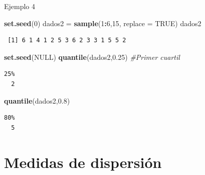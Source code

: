 \documentclass[
  ignorenonframetext,
]{beamer}
\newenvironment{Shaded}{\begin{snugshade}}{\end{snugshade}}
\newcommand{\CommentTok}[1]{\textcolor[rgb]{0.56,0.35,0.01}{\textit{#1}}}
\newcommand{\DataTypeTok}[1]{\textcolor[rgb]{0.13,0.29,0.53}{#1}}
\newcommand{\DecValTok}[1]{\textcolor[rgb]{0.00,0.00,0.81}{#1}}
\newcommand{\FloatTok}[1]{\textcolor[rgb]{0.00,0.00,0.81}{#1}}
\newcommand{\KeywordTok}[1]{\textcolor[rgb]{0.13,0.29,0.53}{\textbf{#1}}}
\newcommand{\NormalTok}[1]{#1}
\newcommand{\OperatorTok}[1]{\textcolor[rgb]{0.81,0.36,0.00}{\textbf{#1}}}
\newcommand{\OtherTok}[1]{\textcolor[rgb]{0.56,0.35,0.01}{#1}}
\newcommand{\StringTok}[1]{\textcolor[rgb]{0.31,0.60,0.02}{#1}}
\begin{document}
\begin{frame}[fragile]{Ejemplo 4}
\protect\hypertarget{ejemplo-4}{}

\begin{Shaded}
\begin{Highlighting}[]
\KeywordTok{set.seed}\NormalTok{(}\DecValTok{0}\NormalTok{)}
\NormalTok{dados2 =}\StringTok{ }\KeywordTok{sample}\NormalTok{(}\DecValTok{1}\OperatorTok{:}\DecValTok{6}\NormalTok{,}\DecValTok{15}\NormalTok{, }\DataTypeTok{replace =} \OtherTok{TRUE}\NormalTok{)}
\NormalTok{dados2}
\end{Highlighting}
\end{Shaded}

\begin{verbatim}
 [1] 6 1 4 1 2 5 3 6 2 3 3 1 5 5 2
\end{verbatim}

\begin{Shaded}
\begin{Highlighting}[]
\KeywordTok{set.seed}\NormalTok{(}\OtherTok{NULL}\NormalTok{)}
\KeywordTok{quantile}\NormalTok{(dados2,}\FloatTok{0.25}\NormalTok{) }\CommentTok{#Primer cuartil}
\end{Highlighting}
\end{Shaded}

\begin{verbatim}
25% 
  2 
\end{verbatim}

\begin{Shaded}
\begin{Highlighting}[]
\KeywordTok{quantile}\NormalTok{(dados2,}\FloatTok{0.8}\NormalTok{)}
\end{Highlighting}
\end{Shaded}

\begin{verbatim}
80% 
  5 
\end{verbatim}

\end{frame}

\hypertarget{medidas-de-dispersiuxf3n}{%
\section{Medidas de dispersión}\label{medidas-de-dispersiuxf3n}}
\end{document}
